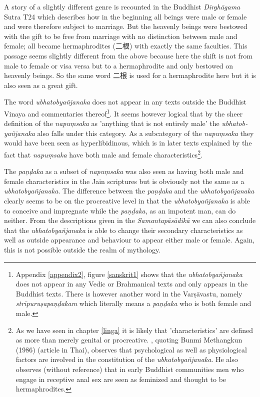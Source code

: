 A story of a slightly different genre is recounted in the Buddhist {\em Dīrghāgama} Sutra T24 which describes how in the beginning all beings were male or female and were therefore subject to marriage. But the heavenly beings were bestowed with the gift to be free from marriage with no distinction between male and female; all became hermaphrodites (二根) with exactly the same faculties. This passage seems slightly different from the above because here the shift is not from male to female or visa versa but to a hermaphrodite and only bestowed on heavenly beings. So the same word 二根 is used for a hermaphrodite here but it is also seen as a great gift.

The word {\em ubhatob­yañ­janaka} does not appear in any texts outside the Buddhist Vinaya and commentaries thereof\footnote{Appendix \ref{appendix2}, figure \ref{sanskrit1} shows that the {\em ubhatob­yañ­janaka} does not appear in any Vedic or Brahmanical texts and only appears in the Buddhist texts. There is however another word in the {\m Varṣāvastu}, namely {\em strīpuruṣapaṇḍakam} which literally means a {\em paṇḍaka} who is both female and male.}. It seems however logical that by the sheer definition of the {\em napuṃsaka} as 'anything that is not entirely male' the {\em ubhatob­yañ­janaka} also falls under this category. As a subcategory of the {\em napuṃsaka} they would have been seen as hyperlibidinous, which is in later texts explained by the fact that {\em napuṃsaka} have both male and female characteristics\footnote{As we have seen in chapter \ref{linga} it is likely that 'characteristics' are defined as more than merely genital or procreative. \cite{jackson}, quoting Bunmi Methangkun (1986) (article in Thai), observes that psychological as well as physiological factors are involved in the constitution of the {\em ubhatob­yañ­janaka}. He also observes (without reference) that in early Buddhist communities men who engage in receptive anal sex are seen as feminized and thought to be hermaphrodites.}. 

The {\em paṇḍaka} as a subset of {\em napuṃsaka} was also seen as having both male and female characteristics in the Jain scriptures but is obviously not the same as a {\em ubhatob­yañ­janaka}. The difference between the {\em paṇḍaka} and the {\em ubhatob­yañ­janaka} clearly seems to be on the procreative level in that the {\em ubhatob­yañ­janaka} is able to conceive and impregnate while the {\em paṇḍaka}, as an impotent man, can do neither. From the descriptions given in the {\em Samantapāsādikā} we can also conclude that the {\em ubhatob­yañ­janaka} is able to change their secondary characteristics as well as outside appearance and behaviour to appear either male or female. Again, this is not possible outside the realm of mythology.

